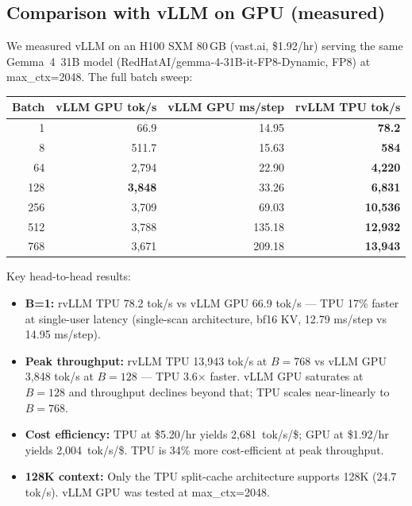 \subsection{Comparison with vLLM on GPU (measured)}

We measured vLLM on an H100 SXM 80\,GB (vast.ai, \$1.92/hr) serving
the same Gemma~4~31B model (RedHatAI/gemma-4-31B-it-FP8-Dynamic,
FP8) at max\_ctx=2048. The full batch sweep:

\begin{center}
\begin{tabular}{rrrr}
\toprule
\textbf{Batch} & \textbf{vLLM GPU tok/s} & \textbf{vLLM GPU ms/step} & \textbf{rvLLM TPU tok/s} \\
\midrule
1   & 66.9   & 14.95  & \textbf{78.2} \\
8   & 511.7  & 15.63  & \textbf{584} \\
64  & 2{,}794 & 22.90  & \textbf{4{,}220} \\
128 & \textbf{3{,}848} & 33.26  & \textbf{6{,}831} \\
256 & 3{,}709 & 69.03  & \textbf{10{,}536} \\
512 & 3{,}788 & 135.18 & \textbf{12{,}932} \\
768 & 3{,}671 & 209.18 & \textbf{13{,}943} \\
\bottomrule
\end{tabular}
\end{center}

\noindent Key head-to-head results:

\begin{itemize}
\item \textbf{B=1:} rvLLM TPU 78.2 tok/s vs vLLM GPU 66.9 tok/s ---
  TPU 17\% faster at single-user latency (single-scan architecture,
  bf16 KV, 12.79 ms/step vs 14.95 ms/step).

\item \textbf{Peak throughput:} rvLLM TPU 13{,}943 tok/s at $B{=}768$
  vs vLLM GPU 3{,}848 tok/s at $B{=}128$ --- TPU 3.6$\times$ faster.
  vLLM GPU saturates at $B{=}128$ and throughput declines beyond that;
  TPU scales near-linearly to $B{=}768$.

\item \textbf{Cost efficiency:} TPU at \$5.20/hr yields
  2{,}681~tok/s/\$; GPU at \$1.92/hr yields 2{,}004~tok/s/\$. TPU
  is 34\% more cost-efficient at peak throughput.

\item \textbf{128K context:} Only the TPU split-cache architecture
  supports 128K (24.7 tok/s). vLLM GPU was tested at max\_ctx=2048.
\end{itemize}

